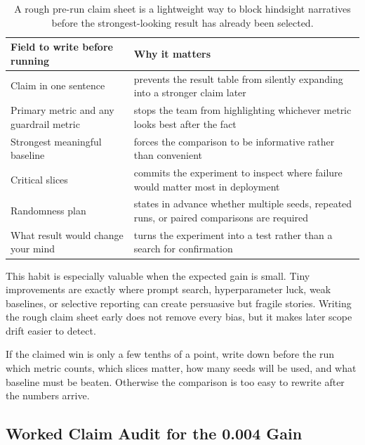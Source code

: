 \begin{table}[t]
\centering
\small
\setlength{\tabcolsep}{4pt}
\begin{tabular}{@{}>{\raggedright\arraybackslash}p{3.26cm}>{\raggedright\arraybackslash}p{7.25cm}@{}}
\toprule
Field to write before running & Why it matters \\
\midrule
Claim in one sentence & prevents the result table from silently expanding into a stronger claim later \\
Primary metric and any guardrail metric & stops the team from highlighting whichever metric looks best after the fact \\
Strongest meaningful baseline & forces the comparison to be informative rather than convenient \\
Critical slices & commits the experiment to inspect where failure would matter most in deployment \\
Randomness plan & states in advance whether multiple seeds, repeated runs, or paired comparisons are required \\
What result would change your mind & turns the experiment into a test rather than a search for confirmation \\
\bottomrule
\end{tabular}
\caption{A rough pre-run claim sheet is a lightweight way to block hindsight narratives before the strongest-looking result has already been selected.}
\label{tab:prerun-claim-sheet}
\end{table}

This habit is especially valuable when the expected gain is small. Tiny improvements are exactly where prompt search, hyperparameter luck, weak baselines, or selective reporting can create persuasive but fragile stories. Writing the rough claim sheet early does not remove every bias, but it makes later scope drift easier to detect.

\begin{practicalnote}
If the claimed win is only a few tenths of a point, write down before the run which metric counts, which slices matter, how many seeds will be used, and what baseline must be beaten. Otherwise the comparison is too easy to rewrite after the numbers arrive.
\end{practicalnote}

\subsection{Worked Claim Audit for the 0.004 Gain}

